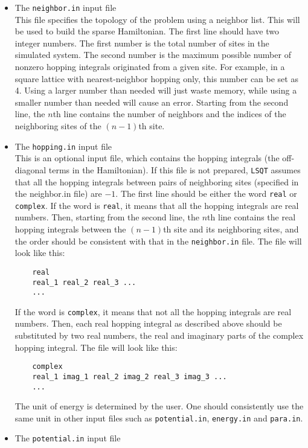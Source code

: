 \documentclass[12pt,a4paper]{report}
\begin{document}
\begin{itemize}
\item The \verb"neighbor.in" input file\\
This file specifies the topology of the problem using a neighbor list. This will be used to build the sparse Hamiltonian. The first line should have two integer numbers. The first number is the total number of sites in the simulated system. The second number is the maximum possible number of nonzero hopping integrals originated from a given site. For example, in a square lattice with nearest-neighbor hopping only, this number can be set as 4. Using a larger number than needed will just waste memory, while using a smaller number than needed will cause an error. Starting from the second line, the $n$th line contains the number of neighbors and the indices of the neighboring sites of the $(n-1)$th site.
\item The \verb"hopping.in" input file\\
This is an optional input file, which contains the hopping integrals (the off-diagonal terms in the Hamiltonian). If this file is not prepared, \verb"LSQT" assumes that all the hopping integrals between pairs of neighboring sites (specified in the neighbor.in file) are $-1$. 
The first line should be either the word \verb"real" or \verb"complex".
If the word is \verb"real", it means that all the hopping integrals are real numbers. Then, starting from the second line, the $n$th line contains the real hopping integrals between the $(n-1)$th site and its neighboring sites, and the order should be consistent with that in the \verb"neighbor.in" file. The file will look like this:
\begin{verbatim}
    real
    real_1 real_2 real_3 ...
    ...
\end{verbatim}
If the word is \verb"complex", it means that not all the hopping integrals are real numbers. Then, each real hopping integral as described above should be substituted by two real numbers, the real and imaginary parts of the complex hopping integral. The file will look like this:
\begin{verbatim}
    complex
    real_1 imag_1 real_2 imag_2 real_3 imag_3 ...
    ...
\end{verbatim}
The unit of energy is determined by the user. One should consistently use the same unit in other input files such as \verb"potential.in", \verb"energy.in" and \verb"para.in".
\item The \verb"potential.in" input file\\

\end{itemize}
\end{document}

